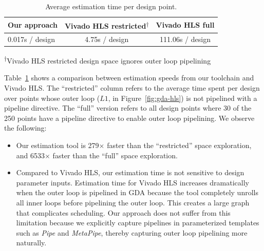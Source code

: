 \begin{table}
\centering\footnotesize
\begin{tabular}{lcc}
\toprule
{\bf Our approach}  & {\bf Vivado HLS restricted\textsuperscript{$\dagger$}} & {\bf Vivado HLS full} \\ \midrule
0.017s / design     & 4.75s / design               & 111.06s / design      \\ \midrule
\end{tabular}
\textsuperscript{$\dagger$}Vivado HLS restricted design space ignores outer loop pipelining
\caption{Average estimation time per design point.}
\label{t:speeds}
\end{table}

Table~\ref{t:speeds} shows a comparison between estimation speeds from our toolchain and Vivado HLS.
The ``restricted'' column refers to the average time spent per design over points whose outer loop ($L1$, in Figure~\ref{fig:gda-hls})
is not pipelined with a pipeline directive. The ``full'' version refers to all design points where 30 of the 250 points
have a pipeline directive to enable outer loop pipelining. We observe the following:
\begin{itemize}
  \item Our estimation tool is 279$\times$ faster than the ``restricted'' space exploration, and 6533$\times$ faster than the ``full'' space exploration.
  \item Compared to Vivado HLS, our estimation time is not sensitive to design parameter inputs. Estimation time for Vivado HLS increases
    dramatically when the outer loop is pipelined in GDA because the tool completely unrolls all inner loops
    before pipelining the outer loop. This creates a large graph that complicates scheduling. Our approach does not
    suffer from this limitation because we explicitly capture pipelines in parameterized templates such as \emph{Pipe} and
    \emph{MetaPipe}, thereby capturing outer loop pipelining more naturally.
\end{itemize}


